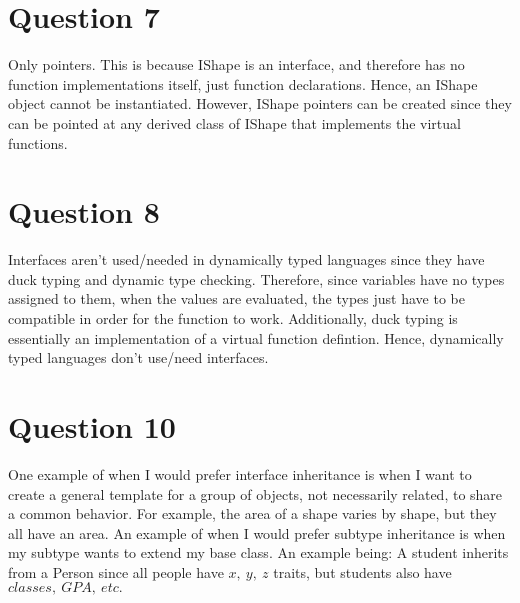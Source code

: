 \documentclass[13pt]{article}
\begin{document}
\newpage
\section*{Question 7}
Only pointers. This is because IShape is an interface, and therefore
has no function implementations itself, just function
declarations. Hence, an IShape object cannot be instantiated. However,
IShape pointers can be created since they can be pointed at any
derived class of IShape that implements the virtual functions.

\newpage
\section*{Question 8}
Interfaces aren't used/needed in dynamically typed languages since
they have duck typing and dynamic type checking. Therefore, since
variables have no types assigned to them, when the values are
evaluated, the types just have to be compatible in order for the
function to work. Additionally, duck typing is essentially an
implementation of a virtual function defintion. Hence, dynamically
typed languages don't use/need interfaces.

\newpage
\section*{Question 10}
One example of when I would prefer interface inheritance is when I
want to create a general template for a group of objects, not
necessarily related, to share a common behavior. For example, the area
of a shape varies by shape, but they all have an area. An example of
when I would prefer subtype inheritance is when my subtype wants to
extend my base class. An example being: A student inherits from a
Person since all people have $x, \ y, \ z$ traits, but students also
have $classes, \ GPA, \ etc.$
\end{document}
